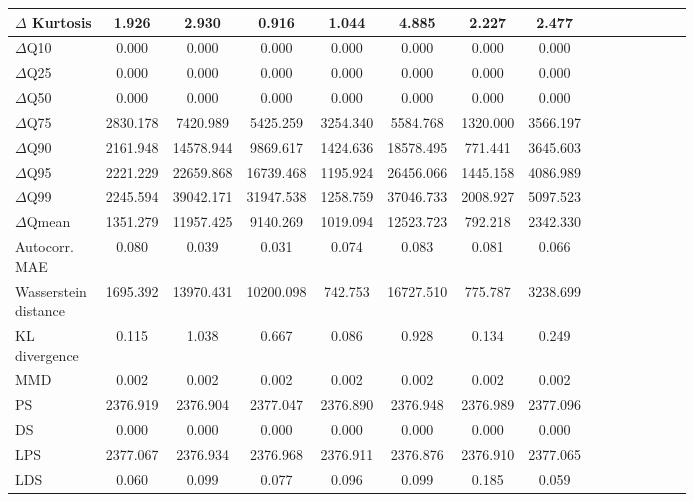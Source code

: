 \documentclass[make,article,submit,moreauthors]{Definitions/mdpi}
\begin{document}
\begin{table}[htbp]
\begin{tabular*}{\textwidth}{@{\extracolsep{\fill}}l|cccccccccccccc}
$\Delta$ Kurtosis                   & 1.926    & 2.930     & 0.916     & 1.044    & 4.885     & 2.227    & 2.477            \\ \hline
$\Delta$Q10                         & 0.000    & 0.000     & 0.000     & 0.000    & 0.000     & 0.000    & 0.000            \\ \hline
$\Delta$Q25                         & 0.000    & 0.000     & 0.000     & 0.000    & 0.000     & 0.000    & 0.000            \\ \hline
$\Delta$Q50                         & 0.000    & 0.000     & 0.000     & 0.000    & 0.000     & 0.000    & 0.000            \\ \hline
$\Delta$Q75                         & 2830.178 & 7420.989  & 5425.259  & 3254.340 & 5584.768  & 1320.000 & 3566.197         \\ \hline
$\Delta$Q90                         & 2161.948 & 14578.944 & 9869.617  & 1424.636 & 18578.495 & 771.441  & 3645.603         \\ \hline
$\Delta$Q95                         & 2221.229 & 22659.868 & 16739.468 & 1195.924 & 26456.066 & 1445.158 & 4086.989         \\ \hline
$\Delta$Q99                         & 2245.594 & 39042.171 & 31947.538 & 1258.759 & 37046.733 & 2008.927 & 5097.523         \\ \hline
$\Delta$Qmean                       & 1351.279 & 11957.425 & 9140.269  & 1019.094 & 12523.723 & 792.218  & 2342.330         \\ \hline
\shortstack{Autocorr.\\MAE}         & 0.080    & 0.039     & 0.031     & 0.074    & 0.083     & 0.081    & 0.066            \\ \hline
\shortstack{Wasserstein\\distance}  & 1695.392 & 13970.431 & 10200.098 & 742.753  & 16727.510 & 775.787  & 3238.699         \\ \hline
\shortstack{KL\\divergence}         & 0.115    & 1.038     & 0.667     & 0.086    & 0.928     & 0.134    & 0.249            \\ \hline
MMD                                 & 0.002    & 0.002     & 0.002     & 0.002    & 0.002     & 0.002    & 0.002            \\ \hline
PS                                  & 2376.919 & 2376.904  & 2377.047  & 2376.890 & 2376.948  & 2376.989 & 2377.096         \\ \hline
DS                                  & 0.000    & 0.000     & 0.000     & 0.000    & 0.000     & 0.000    & 0.000            \\ \hline
LPS                                 & 2377.067 & 2376.934  & 2376.968  & 2376.911 & 2376.876  & 2376.910 & 2377.065         \\ \hline
LDS                                 & 0.060    & 0.099     & 0.077     & 0.096    & 0.099     & 0.185    & 0.059           \\

\bottomrule
\end{tabular*}
\end{table}
\end{document}
